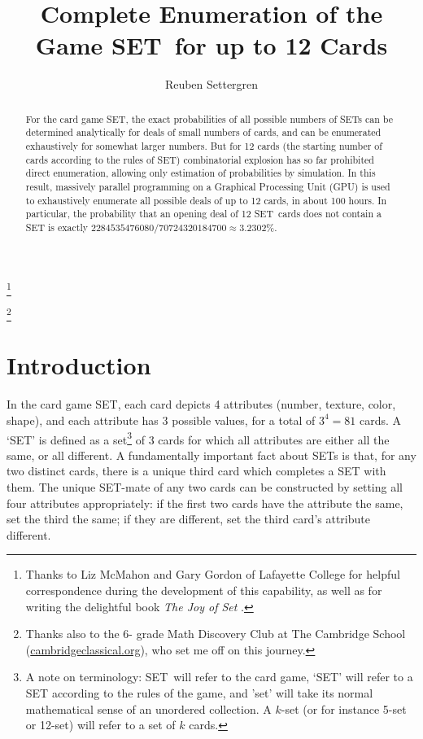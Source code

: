 \documentclass[10pt]{amsart}
\newcommand{\SETb}{SET\texttrademark\ } %
\newcommand{\SET}{SET\texttrademark}  %
\begin{document}
\title[SET Enumeration]{Complete Enumeration of the Game \SETb for up to 12 Cards}
\author[Settergren]{Reuben Settergren}

\thanks{Thanks to Liz McMahon and Gary Gordon of Lafayette College for helpful
  correspondence during the development of this capability, as well as for
  writing the delightful book {\em The Joy of Set} \cite{JOS}.}

\thanks{Thanks also to the 6- grade Math Discovery Club at The Cambridge
  School (\url{cambridgeclassical.org}), who set me off on this journey.}

\maketitle

\begin{abstract}
For the card game \SET, the exact probabilities of all possible numbers of SETs
can be determined analytically for deals of small numbers of cards, and can be
enumerated exhaustively for somewhat larger numbers. But for 12 cards (the
starting number of cards according to the rules of \SET) combinatorial explosion
has so far prohibited direct enumeration, allowing only estimation of
probabilities by simulation. In this result, massively parallel programming on a
Graphical Processing Unit (GPU) is used to exhaustively enumerate all possible
deals of up to 12 cards, in about 100 hours. In particular, the probability that
an opening deal of 12 \SETb cards does not contain a SET is exactly
$2284535476080/70724320184700 \approx 3.2302\%$.
\end{abstract}

\section{Introduction}
In the card game \SET\cite{SET}, each card depicts 4 attributes (number,
texture, color, shape), and each attribute has 3 possible values, for a total of
$3^4=81$ cards. A `SET' is defined as a set\footnote{A note on terminology:
  \SETb will refer to the card game, `SET' will refer to a SET according to the
  rules of the game, and 'set' will take its normal mathematical sense of an
  unordered collection. A $k$-set (or for instance 5-set or 12-set) will refer
  to a set of $k$ cards.} of 3 cards for which all attributes are either all the
same, or all different. A fundamentally important fact about SETs is that, for
any two distinct cards, there is a unique third card which completes a SET with
them. The unique SET-mate of any two cards can be constructed by setting all
four attributes appropriately: if the first two cards have the attribute the
same, set the third the same; if they are different, set the third card's
attribute different.
\end{document}
